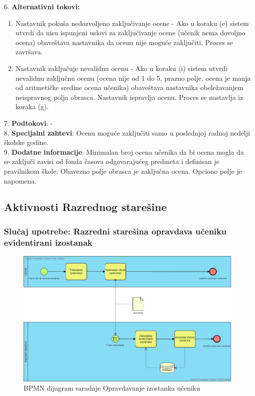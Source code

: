 \documentclass{article}
\begin{document}
6. \textbf{Alternativni tokovi:}
\begin{enumerate} [label=(\roman*)]
\item Nastavnik pokuša nedozvoljeno zaključivanje ocene - Ako u koraku (e) sistem utvrdi da nisu ispunjeni uslovi za zaključivanje ocene (učenik nema dovoljno ocena) obaveštava nastavnika da ocenu nije moguće zaključiti. Proces se završava.
\item Nastavnik zaključuje nevalidnu ocenu - Ako u koraku (i) sistem utvrdi nevalidnu zaključnu ocenu (ocena nije od 1 do 5, prazno polje, ocena je manja od aritmetičke sredine ocena učenika) obaveštava nastavnika obeležavanjem neispravnog polja obrasca. Nastavnik ispravlja ocenu. Proces se nastavlja iz koraka (g).
\end{enumerate}

7. \textbf{Podtokovi}: - \\

8. \textbf{Specijalni zahtevi}: Ocenu moguće zaključiti samo u poslednjoj radnoj nedelji školske godine. \\

9. \textbf{Dodatne informacije}: Minimalan broj ocena učenika da bi ocena mogla da se zaključi zavisi od fonda časova odgovarajućeg predmeta i definisan je pravilnikom škole. Obavezno polje obrasca je zaključna ocena. Opciono polje je napomena. \\


\subsection{Aktivnosti Razrednog starešine}

\subsubsection{Slučaj upotrebe: Razredni starešina opravdava učeniku evidentirani izostanak}

\begin{figure} [!ht]
    \begin{center}
        \includegraphics[scale=0.25]{imgs/BPMN_opravdavanje_casova.png}
    \end{center}
\caption{BPMN dijagram saradnje Opravdavanje izostanka učeniku}
\end{figure}
\end{document}
